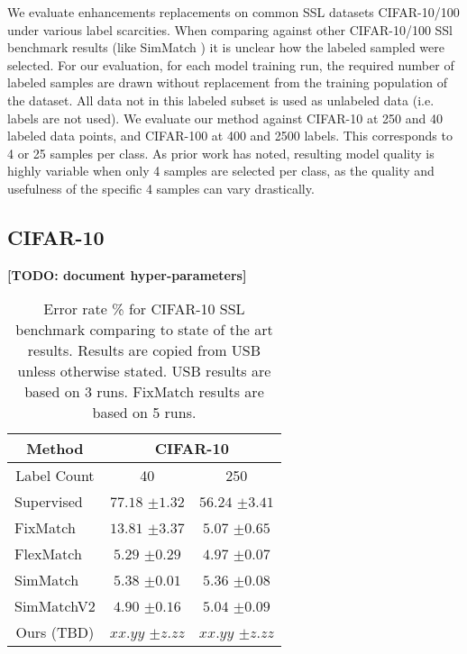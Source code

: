 \documentclass[10pt,twocolumn,letterpaper]{article}
\newcommand{\TODO}[1]{\textbf{\color{red}[TODO: #1]}}
\begin{document}
We evaluate enhancements replacements on common SSL datasets CIFAR-10/100 \cite{cifar10} under various label scarcities. 
When comparing against other CIFAR-10/100 SSl benchmark results (like SimMatch \cite{zheng2022simmatch}) it is unclear how the labeled sampled were selected. 
For our evaluation, for each model training run, the required number of labeled samples are drawn without replacement from the training population of the dataset.
All data not in this labeled subset is used as unlabeled data (i.e. labels are not used).
We evaluate our method against CIFAR-10 at 250 and 40 labeled data points, and CIFAR-100 at 400 and 2500 labels. 
This corresponds to 4 or 25 samples per class.
As prior work \cite{sohn2020fixmatch} has noted, resulting model quality is highly variable when only 4 samples are selected per class, as the quality and usefulness of the specific 4 samples can vary drastically. 



\subsection{CIFAR-10}

\TODO {document hyper-parameters}

\begin{table}[htbp]
	\begin{tabular}{c|cc}
		\multicolumn{1}{c|}{Method}           & \multicolumn{2}{c}{CIFAR-10} \\ \hline
		\multicolumn{1}{c|}{Label Count}     & 40            & 250           \\
		\multicolumn{1}{l|}{Supervised} & $77.18$ \scriptsize{$\pm1.32$}   & $56.24$ \scriptsize{$\pm3.41$}   \\ \hline
		\multicolumn{1}{l|}{FixMatch}   & $13.81$ \scriptsize{$\pm3.37$}   & $5.07$ \scriptsize{$\pm0.65$}     \\
		\multicolumn{1}{l|}{FlexMatch}  & $5.29$ \scriptsize{$\pm0.29$}    & $4.97$ \scriptsize{$\pm0.07$}    \\
		\multicolumn{1}{l|}{SimMatch}   & $5.38$ \scriptsize{$\pm0.01$}    & $5.36$ \scriptsize{$\pm0.08$}    \\
		\multicolumn{1}{l|}{SimMatchV2} & $4.90$ \scriptsize{$\pm0.16$}    & $5.04$ \scriptsize{$\pm0.09$}    \\ \hline
		Ours (TBD)                            & $xx.yy$ \scriptsize{$\pm z.zz$}           & $xx.yy$ \scriptsize{$\pm z.zz$}           
	\end{tabular}
	\caption{Error rate \% for CIFAR-10 SSL benchmark comparing to state of the art results. Results are copied from USB \cite{wang2022usb} unless otherwise stated. USB results are based on 3 runs. FixMatch \cite{sohn2020fixmatch} results are based on 5 runs.}
	\label{table2}
\end{table}
\end{document}
